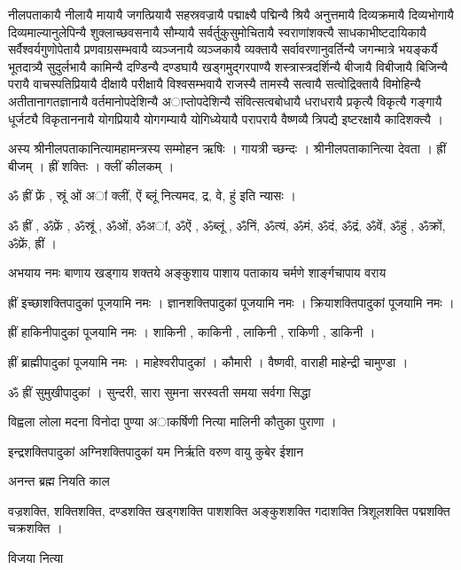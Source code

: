 नीलपताकायै नीलायै मायायै जगत्प्रियायै सहस्रवज्रायै पद्माक्ष्यै पद्मिन्यै श्रियै अनुत्तमायै दिव्यक्रमायै दिव्यभोगायै दिव्यमाल्यानुलेपिन्यै शुक्लाच्छवसनायै सौम्यायै सर्वर्तुकुसुमोचितायै स्वराणांशक्त्यै साधकाभीष्टदायिकायै सर्वैश्वर्यगुणोपेतायै प्रणवाग्रसम्भवायै व्यञ्जनायै व्यञ्जकायै व्यक्तायै सर्वावरणानुवर्तिन्यै जगन्मात्रे भयङ्कर्यै भूतदात्र्यै सुदुर्लभायै कामिन्यै दण्डिन्यै दण्डघायै खड्गमुद्गरपाण्यै शस्त्रास्त्रदर्शिन्यै बीजायै विबीजायै बिजिन्यै परायै वाचस्पतिप्रियायै दीक्षायै परीक्षायै विश्वसम्भवायै राजस्यै तामस्यै सत्वायै सत्वोद्रिक्तायै विमोहिन्यै अतीतानागतज्ञानायै वर्तमानोपदेशिन्यै अाप्तोपदेशिन्यै संवित्सत्वबोधायै धराधरायै प्रकृत्यै विकृत्यै गङ्गायै धूर्जट्यै विकृताननायै योगप्रियायै योगगम्यायै योगिध्येयायै परापरायै वैष्णव्यै त्रिपद्यै इष्टरक्षायै कादिशक्त्यै ।

अस्य श्रीनीलपताकानित्यामहामन्त्रस्य सम्मोहन ऋषिः । गायत्री च्छन्दः । श्रीनीलपताकानित्या देवता । ह्रीं बीजम् । ह्रीं शक्तिः । क्लीं कीलकम् ।

ॐ ह्रीं फ्रें , स्रूं ओं अां क्लीं, ऐं ब्लूं  नित्यमद, द्र, वे, हुं  इति न्यासः ।

ॐ ह्रीं , ॐफ्रें , ॐस्रूं , ॐओं, ॐअां, ॐऐं , ॐब्लूं , ॐनिं, ॐत्यं, ॐमं, ॐदं, ॐद्रं, ॐवें, ॐहुं , ॐक्रों, ॐफ्रें, ह्रीं ।

अभयाय नमः बाणाय खड्गाय शक्तये  अङ्कुशाय पाशाय पताकाय चर्मणे शार्ङ्गचापाय वराय

ह्रीं इच्छाशक्तिपादुकां पूजयामि नमः । ज्ञानशक्तिपादुकां पूजयामि नमः । क्रियाशक्तिपादुकां पूजयामि नमः ।

ह्रीं हाकिनीपादुकां पूजयामि नमः । शाकिनी , काकिनी , लाकिनी , राकिणी , डाकिनी ।

ह्रीं ब्राह्मीपादुकां पूजयामि नमः । माहेश्वरीपादुकां । कौमारी । वैष्णवी, वाराही माहेन्द्री चामुण्डा ।

ॐ ह्रीं सुमुखीपादुकां । सुन्दरी, सारा सुमना सरस्वती समया सर्वगा सिद्धा 

विह्वला लोला मदना विनोदा पुण्या अाकर्षिणी नित्या मालिनी कौतुका  पुराणा ।

इन्द्रशक्तिपादुकां अग्निशक्तिपादुकां यम निर्ऋति वरुण वायु कुबेर ईशान 								

अनन्त ब्रह्म नियति काल 				
																		
वज्रशक्ति, शक्तिशक्ति, दण्डशक्ति खड्गशक्ति पाशशक्ति अङ्कुशशक्ति गदाशक्ति त्रिशूलशक्ति पद्मशक्ति चक्रशक्ति ।



विजया नित्या 
